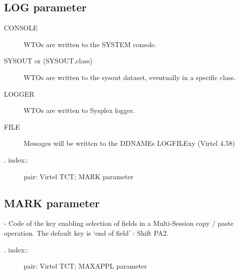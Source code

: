 \documentclass[letterpaper,10pt,english]{sphinxmanual}
\begin{document}
\subsection{LOG parameter}
\label{\detokenize{Installation_Guide:log-parameter}}
\begin{sphinxVerbatim}[commandchars=\\\{\}]
                    
\end{sphinxVerbatim}
\begin{description}
\item[{CONSOLE}] \leavevmode
WTOs are written to the SYSTEM console.

\item[{SYSOUT or (SYSOUT,class)}] \leavevmode
WTOs are written to the sysout dataset, eventually in a specific class.

\item[{LOGGER}] \leavevmode
WTOs are written to Sysplex logger.

\item[{FILE}] \leavevmode
Messages will be written to the DDNAMEs LOGFILEx\textbar{}y               (Virtel 4.58)

\item[{. index::}] \leavevmode
pair: Virtel TCT; MARK parameter

\end{description}


\subsection{MARK parameter}
\label{\detokenize{Installation_Guide:mark-parameter}}
\begin{sphinxVerbatim}[commandchars=\\\{\}]
                              
\end{sphinxVerbatim}

 - Code of the key enabling selection of fields in a Multi-Session copy / paste operation. The default key is ‘end of field’ : Shift PA2.
\begin{description}
\item[{. index::}] \leavevmode
pair: Virtel TCT; MAXAPPL parameter

\end{description}
\end{document}
